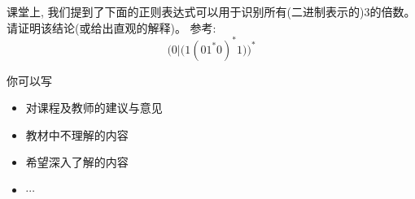 \documentclass[a4paper, justified]{tufte-handout}
\begin{document}
\begin{problem}
  课堂上, 我们提到了下面的正则表达式可以用于识别所有(二进制表示的)3的倍数。
  请证明该结论(或给出直观的解释)。
  参考: 
  \[
    \Big(0|\big(1(01^{\ast}0)^{\ast}1\big)\Big)^{\ast}
  \]
\end{problem}

\begin{solution}
\end{solution}



\beginfb

你可以写
\begin{itemize}
  \item 对课程及教师的建议与意见
  \item 教材中不理解的内容
  \item 希望深入了解的内容
  \item $\cdots$
\end{itemize}
\end{document}
